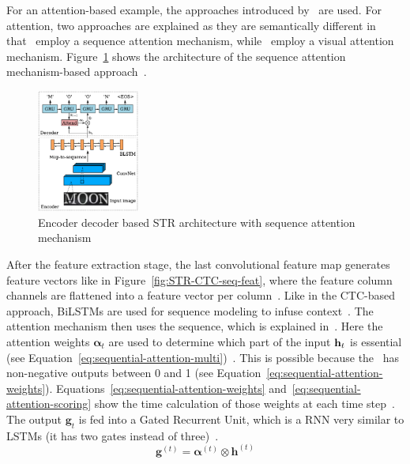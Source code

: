 For an attention-based example, the approaches introduced by~\cite{shi_robust_2016,ghosh_visual_2017}
are used.
For attention, two approaches are explained as they are semantically different in
that~\citep{shi_robust_2016} employ a sequence attention mechanism, while~\cite{ghosh_visual_2017}
employ a visual attention mechanism.
Figure~\ref{fig:STR-sequence-attention} shows the architecture of the sequence attention
mechanism-based approach~\citep{shi_robust_2016}.
\begin{figure}[h]
    \centering
    \includegraphics[width=0.30\textwidth]{img/STR-encdec-attention-Shi-Robust-2016.png}
    \caption[Encoder decoder \& sequence attention based STR architecture]{%
        Encoder decoder based STR architecture with sequence attention
        mechanism~\citep{shi_robust_2016}\label{fig:STR-sequence-attention}
    }
\end{figure}
After the feature extraction stage, the last convolutional feature map generates feature
vectors like in Figure~\ref{fig:STR-CTC-seq-feat}, where the feature column channels are flattened
into a feature vector per column~\citep{shi_robust_2016,shi_end--end_2017}.
Like in the \ac{CTC}-based approach, \acp{BiLSTM} are used for sequence modeling to infuse
context~\citep{shi_robust_2016,shi_end--end_2017}.
The attention mechanism then uses the sequence, which is explained
in~\citep{chorowski_attention-based_2015}.
Here the attention weights $\boldsymbol{\alpha}_t$ are used to determine which part of the input
$\textbf{h}_t$ is essential (see Equation~\ref{eq:sequential-attention-multi})~\citep{shi_robust_2016}.
This is possible because the \sfmx\ has non-negative outputs between 0 and 1 (see
Equation~\ref{eq:sequential-attention-weights}).
Equations~\ref{eq:sequential-attention-weights} and~\ref{eq:sequential-attention-scoring} show the
time calculation of those weights at each time step~\citep{shi_robust_2016}.
The output $\textbf{g}_t$ is fed into a Gated Recurrent Unit, which is a \ac{RNN} very similar to
\acp{LSTM} (it has two gates instead of three)~\citep{dey_gate-variants_2017}.
\begin{equation}\label{eq:sequential-attention-multi}
    \textbf{g}^{(t)}=\boldsymbol{\alpha}^{(t)} \otimes \textbf{h}^{(t)}
\end{equation}
